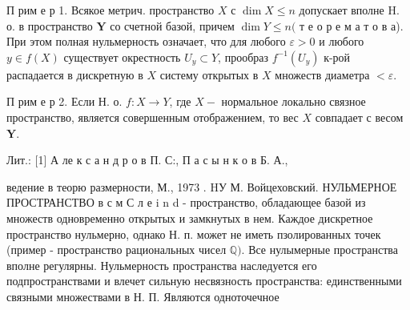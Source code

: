\documentclass[10pt]{article}
\begin{document}
П рим е р 1. Всякое метрич. пространство $X$ с $\operatorname{dim} X \leqslant n$ допускает вполне H. о. в пространство $\boldsymbol{Y}$ со счетной базой, причем $\operatorname{dim} Y \leqslant n($ т е о р е м а т о в а). При этом полная нульмерность означает, что для любого $\varepsilon>0$ и любого $y \in f(X)$ существует окрестность $U_{y} \subset Y$, прообраз $f^{-1}\left(U_{y}\right)$ к-рой распадается в дискретную в $X$ систему открытых в $X$ множеств диаметра $<\varepsilon$.



П рим е р 2. Если Н. о. $f: X \rightarrow Y$, где $X-$ нормальное локально связное пространство, является совершенным отображением, то вес $X$ совпадает с весом $\boldsymbol{Y}$.



Лит.: [1] А ле к с а н д р о в П. С:, П а с ы н к о в Б. А.,

ведение в теорю размерности, М., 1973 . HУ М. Войцеховский. НУЛЬМЕРНОЕ ПРОСТРАНСТВО в с м С л е i n d - пространство, обладающее базой из множеств одновременно открытых и замкнутых в нем. Каждое дискретное пространство нульмерно, однако Н. п. может не иметь пзолированных точек (пример - пространство рациональных чисел $\mathbb{Q})$. Все нулымерные пространства вполне регулярны. Нульмерность пространства наследуется его подпространствами и влечет сильную несвязность пространства: единственными связными множествами в Н. П. Являются одноточечное
\end{document}
